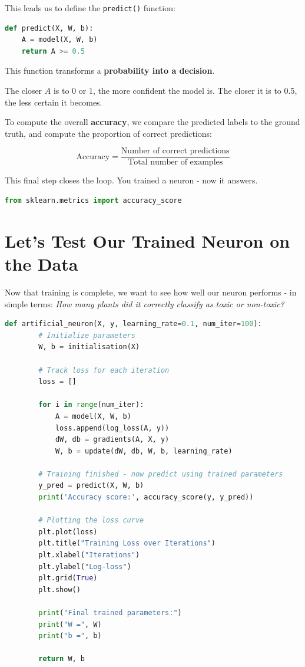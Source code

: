 \documentclass[11pt]{article}
\begin{document}
This leads us to define the \texttt{predict()} function:

\begin{lstlisting}[language=Python]
def predict(X, W, b):
    A = model(X, W, b)
    return A >= 0.5
\end{lstlisting}

\medskip

\noindent This function transforms a \textbf{probability into a decision}.

\begin{tcolorbox}[colback=gray!4, colframe=gray!50!black]
The closer $A$ is to 0 or 1, the more confident the model is.  
The closer it is to 0.5, the less certain it becomes.
\end{tcolorbox}

\bigskip

To compute the overall \textbf{accuracy}, we compare the predicted labels to the ground truth, and compute the proportion of correct predictions:

\[
\text{Accuracy} = \frac{\text{Number of correct predictions}}{\text{Total number of examples}}
\]

This final step closes the loop.  
You trained a neuron - now it answers.


\begin{lstlisting}[language=Python]
    from sklearn.metrics import accuracy_score
    \end{lstlisting}
    
    \section*{Let's Test Our Trained Neuron on the Data}
    
    Now that training is complete, we want to see how well our neuron performs - in simple terms:  
    \textit{How many plants did it correctly classify as toxic or non-toxic?}
    
    \begin{lstlisting}[language=Python]
    def artificial_neuron(X, y, learning_rate=0.1, num_iter=100):
        # Initialize parameters
        W, b = initialisation(X)
    
        # Track loss for each iteration
        loss = []
    
        for i in range(num_iter):
            A = model(X, W, b)
            loss.append(log_loss(A, y))
            dW, db = gradients(A, X, y)
            W, b = update(dW, db, W, b, learning_rate)
    
        # Training finished - now predict using trained parameters
        y_pred = predict(X, W, b)
        print('Accuracy score:', accuracy_score(y, y_pred))
    
        # Plotting the loss curve
        plt.plot(loss)
        plt.title("Training Loss over Iterations")
        plt.xlabel("Iterations")
        plt.ylabel("Log-loss")
        plt.grid(True)
        plt.show()
    
        print("Final trained parameters:")
        print("W =", W)
        print("b =", b)
        
        return W, b
    \end{lstlisting}
    
\end{document}
